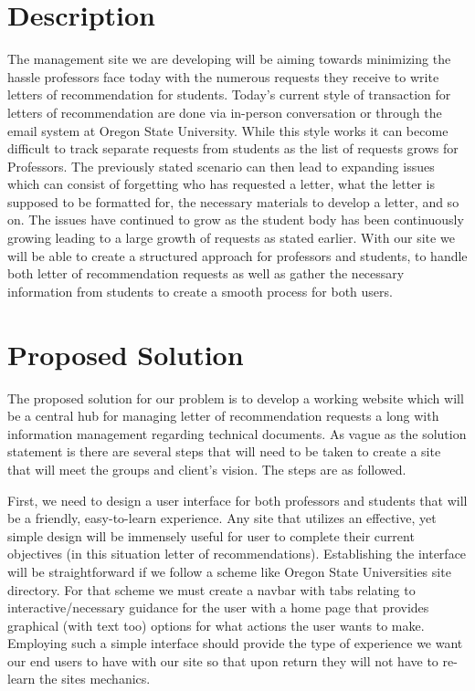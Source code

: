 \documentclass[onecolumn, draftclsnofoot,10pt, compsoc]{IEEEtran}
\begin{document}
\section{Description}
\flushleft
The management site we are developing will be aiming towards minimizing the hassle professors face today with the numerous requests they receive to write letters of recommendation for students. Today’s current style of transaction for letters of recommendation are done via in-person conversation or through the email system at Oregon State University. While this style works it can become difficult to track separate requests from students as the list of requests grows for Professors. The previously stated scenario can then lead to expanding issues which can consist of forgetting who has requested a letter, what the letter is supposed to be formatted for, the necessary materials to develop a letter, and so on. The issues have continued to grow as the student body has been continuously growing leading to a large growth of requests as stated earlier. With our site we will be able to create a structured approach for professors and students, to handle both letter of recommendation requests as well as gather the necessary information from students to create a smooth process for both users.  

\center
\section{Proposed Solution}
\flushleft

The proposed solution for our problem is to develop a working website which will be a central hub for managing letter of recommendation requests a long with information management regarding technical documents. As vague as the solution statement is there are several steps that will need to be taken to create a site that will meet the groups and client’s vision. The steps are as followed.\vspace{4mm}

First, we need to design a user interface for both professors and students that will be a friendly, easy-to-learn experience. Any site that utilizes an effective, yet simple design will be immensely useful for user to complete their current objectives (in this situation letter of recommendations). Establishing the interface will be straightforward if we follow a scheme like Oregon State Universities site directory. For that scheme we must create a navbar with tabs relating to interactive/necessary guidance for the user with a home page that provides graphical (with text too) options for what actions the user wants to make. Employing such a simple interface should provide the type of experience we want our end users to have with our site so that upon return they will not have to re-learn the sites mechanics.\vspace{4mm}
\end{document}
